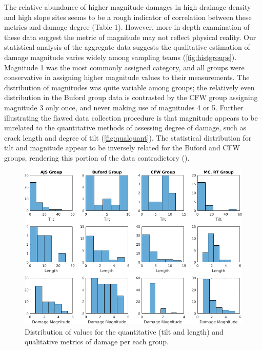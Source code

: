 \documentclass[final,12pt,times,twocolumn,authoryear]{elsarticle}
\begin{document}
The relative abundance of higher magnitude damages in high drainage density and high slope sites seems to be a rough indicator of correlation between these metrics and damage degree (Table 1). However, more in depth examination of these data suggest the metric of magnitude may not reflect physical reality. Our statistical analysis of the aggregate data suggests the qualitative estimation of damage magnitude varies widely among sampling teams (\autoref{fig:histgroups}). Magnitude 1 was the most commonly assigned category, and all groups were conservative in assigning higher magnitude values to their measurements. The distribution of magnitudes was quite variable among groups; the relatively even distribution in the Buford group data is contrasted by the CFW group assigning magnitude 3 only once, and never making use of magnitudes 4 or 5. Further illustrating the flawed data collection procedure is that magnitude appears to be unrelated to the quantitative methods of assessing degree of damage, such as crack length and degree of tilt (\autoref{fig:qualquant}). The statistical distribution for tilt and magnitude appear to be inversely related for the Buford and CFW groups, rendering this portion of the data contradictory ().

\begin{figure}[hbt]
	\centering
	\includegraphics[width=\linewidth]{fig/hist9-9}
	\caption{Distribution of values for the quantitative (tilt and length) and qualitative metrics of damage per each group.}
	\label{fig:histgroups}
\end{figure}
\end{document}
